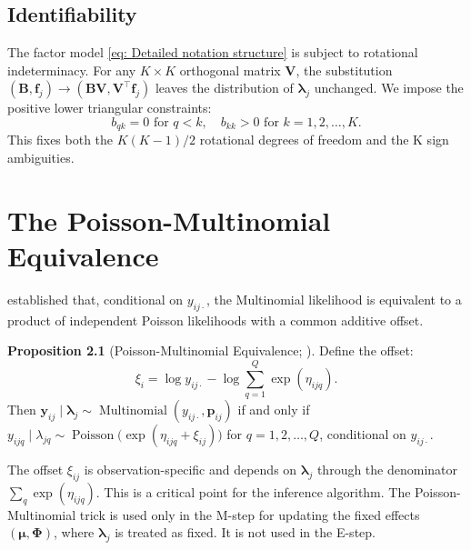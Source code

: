 \documentclass[]{report}
\theoremstyle{definition}
\newtheorem{proposition}{Proposition}
\begin{document}
\section{Identifiability}
    The factor model \ref{eq: Detailed notation structure} is subject to rotational indeterminacy. For any $K\times K$ orthogonal matrix $\mathbf{V}$, the substitution $(\mathbf{B},\mathbf{f}_{j})\to (\mathbf{BV},\mathbf{V}^{\top}\mathbf{f}_{j})$ leaves the distribution of $\bm{\lambda}_{j}$ unchanged. We impose the positive lower triangular constraints:
\begin{equation}
    b_{qk}=0 \text{ for } q<k, \quad b_{kk}>0 \text{ for }k=1,2,\dots ,K.
    \label{eq: PLT}
\end{equation}
    This fixes both the $K(K-1)/2$ rotational degrees of freedom and the K sign ambiguities.

\chapter{The Poisson-Multinomial Equivalence}

    \citet{10.2307/2348134} established that, conditional on $y_{ij\cdot}$, the Multinomial likelihood is equivalent to a product of independent Poisson likelihoods with a common additive offset.
\begin{proposition}[Poisson-Multinomial Equivalence; \citet{10.2307/2348134}]
    Define the offset:
    \begin{equation*}
        \xi_{i}=\log y_{ij\cdot}-\log \sum_{q=1}^{Q}\exp(\eta_{ijq}).
    \end{equation*}
    Then $\bm{y}_{ij}\mid \bm{\lambda}_{j}\sim \operatorname{Multinomial}(y_{ij\cdot}, \bm{p}_{ij})$ if and only if $y_{ijq}\mid \lambda_{jq}\sim \operatorname{Poisson}\bigl(\exp(\eta_{ijq}+\xi_{ij})\bigr)$ for $q=1,2,\dots, Q$, conditional on $y_{ij\cdot}$.
\end{proposition}
    The offset $\xi_{ij}$ is observation-specific and depends on $\bm{\lambda}_{j}$ through the denominator $\sum_{q}\exp(\eta_{ijq})$. This is a critical point for the inference algorithm. The Poisson-Multinomial trick is used only in the M-step for updating the fixed effects $(\bm{\mu}, \bm{\Phi})$, where $\bm{\lambda}_{j}$ is treated as fixed. It is not used in the E-step.
    
\end{document}
